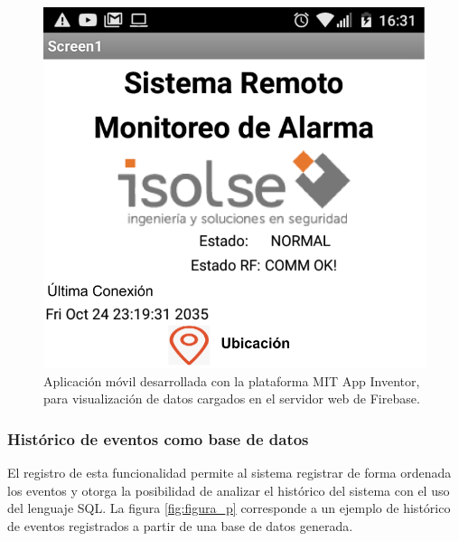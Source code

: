 \begin{figure}[ht]
	\centering
	\includegraphics[scale=.35]{./Figures/Capitulo4/Figura_N.png}
	\caption{Aplicación móvil desarrollada con la plataforma MIT App Inventor, para visualización de datos cargados en el servidor web de Firebase.}
	\label{fig:figura_n}
\end{figure}

\subsubsection{Histórico de eventos como base de datos}
El registro de esta funcionalidad permite al sistema registrar de forma ordenada los eventos y otorga la posibilidad de analizar el histórico del sistema con el uso del lenguaje SQL. La figura \ref{fig:figura_p} corresponde a un ejemplo de histórico de eventos registrados a partir de una base de datos generada.

\break


